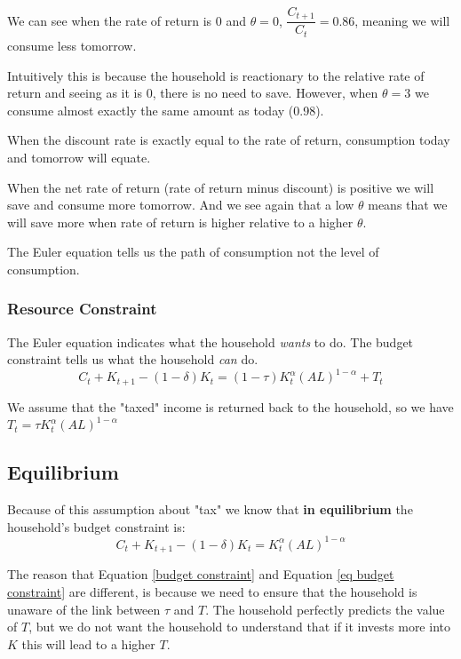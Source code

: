 \documentclass[11pt]{article}
\begin{document}
We can see when the rate of return is 0 and $\theta = 0$, $\dfrac{C_{t+1}}{C_t}=0.86$, meaning we will consume less  tomorrow. 

\begin{intu}
    Intuitively this is because the household is reactionary to the relative rate of return and seeing as it is 0, there is no need to save. However, when $\theta=3$ we consume almost exactly the same amount as today (0.98).

When the discount rate is exactly equal to the rate of return, consumption today and tomorrow will equate.

When the net rate of return (rate of return minus discount) is positive we will save and consume more tomorrow. And we see again that a low $\theta$ means that we will save more when rate of return is higher relative to a higher $\theta$.
\end{intu}


The Euler equation tells us the path of consumption not the level of consumption.

\subsubsection{Resource Constraint}

The Euler equation indicates what the household \textit{wants} to do. The budget constraint tells us what the household \textit{can} do.
\begin{equation}
    \label{budget constraint}
    C_t + K_{t+1} - (1-\delta)K_t = (1-\tau)K_t^\alpha (AL)^{1-\alpha} + T_t
\end{equation}

We assume that the "taxed" income is returned back to the household, so we have $T_t = \tau K_t^\alpha(AL)^{1-\alpha}$

\subsection{Equilibrium}

Because of this assumption about "tax" we know that \textbf{in equilibrium} the household's budget constraint is:
\begin{equation}
    \label{eq budget constraint}
    C_t + K_{t+1} - (1-\delta)K_t = K_t^\alpha(AL)^{1-\alpha}
\end{equation}

\begin{note}
    The reason that Equation \eqref{budget constraint} and Equation \eqref{eq budget constraint} are different, is because we need to ensure that the household is unaware of the link between $\tau$ and $T$. The household perfectly predicts the value of $T$, but we do not want the household to understand that if it invests more into $K$ this will lead to a higher $T$.
\end{note}
\end{document}
